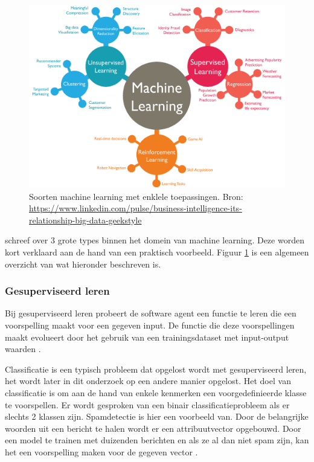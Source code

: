 \begin{figure}
    \includegraphics[width=\linewidth]{img/ml-soorten.png}
    \caption{Soorten machine learning met enklele toepassingen. Bron: \url{https://www.linkedin.com/pulse/business-intelligence-its-relationship-big-data-geekstyle}}
    \label{fig:ml-soorten}
\end{figure}

\textcite{Lievens2019} schreef over 3 grote types binnen het domein van machine learning. Deze worden kort verklaard aan de hand van een praktisch voorbeeld. Figuur \ref{fig:ml-soorten} is een algemeen overzicht van wat hieronder beschreven is.


\subsubsection{Gesuperviseerd leren}
\label{subsubsec:gesuperviseerd-leren}

Bij gesuperviseerd leren probeert de software agent een functie te leren die een voorspelling maakt voor een gegeven input. De functie die deze voorspellingen maakt evolueert door het gebruik van een trainingsdataset met input-output waarden \autocite{Norvig1994}.

Classificatie is een typisch probleem dat opgelost wordt met gesuperviseerd leren, het wordt later in dit onderzoek op een andere manier opgelost. Het doel van classificatie is om aan de hand van enkele kenmerken een voorgedefinieerde klasse te voorspellen. Er wordt gesproken van een binair classificatieprobleem als er slechts 2 klassen zijn. Spamdetectie is hier een voorbeeld van. Door de belangrijke woorden uit een bericht te halen wordt er een attribuutvector opgebouwd. Door een model te trainen met duizenden berichten en als ze al dan niet spam zijn, kan het een voorspelling maken voor de gegeven vector \autocite{Lievens2019}.

